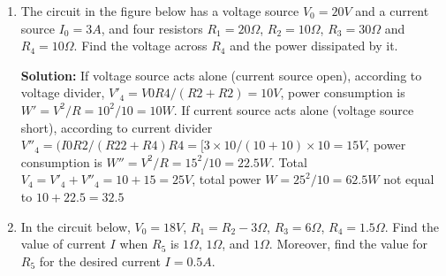 \begin{enumerate}
\begin{enumerate}

{\bf Solution:}
\begin{itemize}
  \item Find Thevenin's voltage source $V_T$ with $R_T$. First turn voltage
    sources off and find $R_T$ between nodes $a$ and $b$:
    \[ R_T=R_1||R_4+R_2||R_5=\frac{R_1R_4}{R_1+R_4}+\frac{R_2R_5}{R_2+R_5}=78/35 \]
    Find $V_{oc}$:
    \[ V_a=V_1\frac{R_1}{R_1+R_4}=4/5,\;\;\;\;\;\;\;V_b=-V_2\frac{R_2}{R_2+R_5}=-10/7 \]
    \[ V_{oc}=V_a-V_b=78/35 \]
  \item Norton's current source $I_N$ with $R_N$.
    First $R_N=R_T=78/35$. Then use loop current method to find $I_N=I_{sc}$.
    Assume loop currents $I_a$ (top-left loop), $I_b$ (bottom left loop) and
    $I_c=I_{sc}=I_N$ (right loop), and we have these loop current equations:
    \[ \left\{ \begin{array}{rrr}
      5I_a & &-I_c=4 \\ & 7I_b&-2I_c=5\\ -I_a&-2I_b&+3I_c=0 \end{array} \right. \]
    Solving this to get $I_N=I_{sc}=I_c=1$.
  \item Verify your results by converting the current source into a voltage
    source (or vise versa).
    \[ I_N R_N=78/35=V_T \]
\end{itemize}
Finally, 
\[ I=\frac{V_T}{R_T+R_3}=\frac{78/35}{78/35+3}=\frac{78}{183}=0.426 \]
\[ V=IR_3=1.28V \]

\end{enumerate}


\item The circuit in the figure below has a voltage source $V_0=20V$ and a 
current source $I_0=3A$, and four resistors $R_1=20\Omega$, $R_2=10\Omega$, 
$R_3=30\Omega$ and $R_4=10\Omega$. Find the voltage across $R_4$ and the 
power dissipated by it.


{\bf Solution:}
If voltage source acts alone (current source open), according to voltage 
divider, $V'_4=V0 R4/(R2+R2)=10V$, power consumption is $W'=V^2/R=10^2/10=10W$.
If current source acts alone (voltage source short), according to current 
divider $V''_4=(I0 R2/(R22+R4) R4=[3\times 10/(10+10)\times 10=15V$, power 
consumption is $W''=V^2/R=15^2/10=22.5W$. Total $V_4=V'_4+V''_4=10+15=25V$, 
total power $W=25^2/10=62.5W$ not equal to $10+22.5=32.5$



\item In the circuit below, $V_0=18V$, $R_1=R_2-3\Omega$, $R_3=6\Omega$,
$R_4=1.5\Omega$. Find the value of current $I$ when $R_5$ is $1\Omega$,
$1\Omega$, and $1\Omega$. Moreover, find the value for $R_5$ for the
desired current $I=0.5A$.


\end{enumerate}
